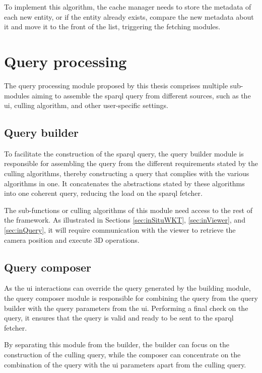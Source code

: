 To implement this algorithm, the cache manager needs to store the metadata of each new entity, or if the entity already exists, compare the new metadata about it and move it to the front of the list, triggering the fetching modules.

\section{Query processing}

The query processing module proposed by this thesis comprises multiple sub-modules aiming to assemble the \ac{sparql} query from different sources, such as the \ac{ui}, culling algorithm, and other user-specific settings.

\subsection{Query builder}

To facilitate the construction of the \ac{sparql} query, the query builder module is responsible for assembling the query from the different requirements stated by the culling algorithms, thereby constructing a query that complies with the various algorithms in one. It concatenates the abstractions stated by these algorithms into one coherent query, reducing the load on the \ac{sparql} fetcher.

The sub-functions or culling algorithms of this module need access to the rest of the framework. As illustrated in Sections \ref{sec:inSituWKT}, \ref{sec:inViewer}, and \ref{sec:inQuery}, it will require communication with the viewer to retrieve the camera position and execute 3D operations.

\subsection{Query composer}

As the \ac{ui} interactions can override the query generated by the building module, the query composer module is responsible for combining the query from the query builder with the query parameters from the \ac{ui}. Performing a final check on the query, it ensures that the query is valid and ready to be sent to the \ac{sparql} fetcher.

By separating this module from the builder, the builder can focus on the construction of the culling query, while the composer can concentrate on the combination of the query with the \ac{ui} parameters apart from the culling query.

